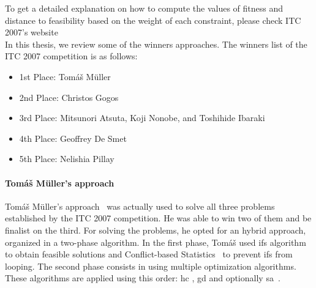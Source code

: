 To get a detailed explanation on how to compute the values of fitness and distance to feasibility based on the weight of each constraint, please check ITC 2007's website~\cite{McCollum2008}\\


In this thesis, we review some of the winners approaches. The winners list of the ITC 2007 competition is as follows:
\begin{itemize}
	\item 1st Place: Tom\'{a}\v{s} M\"{u}ller
	\item 2nd Place: Christos Gogos
	\item 3rd Place: Mitsunori Atsuta, Koji Nonobe, and Toshihide Ibaraki
	\item 4th Place: Geoffrey De Smet
	\item 5th Place: Nelishia Pillay
\end{itemize}

\paragraph{Tom\'{a}\v{s} M\"{u}ller's approach}

Tom\'{a}\v{s} M\"{u}ller's approach~\cite{Mueller2009} was actually used to solve all three problems established by the ITC 2007 competition. He was able to win two of them and be finalist on the third. For solving the problems, he opted for an hybrid approach, organized in a two-phase algorithm. In the first phase, Tom\'{a}\v{s} used \gls{ifs} algorithm~\cite{Mueller2005} to obtain feasible solutions and Conflict-based Statistics~\cite{Mueller2004} to prevent \gls{ifs} from looping. 
The second phase consists in using multiple optimization algorithms. These algorithms are applied using this order: \gls{hc} \cite{Russell2010}, \gls{gd} \cite{Dueck1993} and optionally \gls{sa}~\cite{Kirkpatrick1983}.\\

